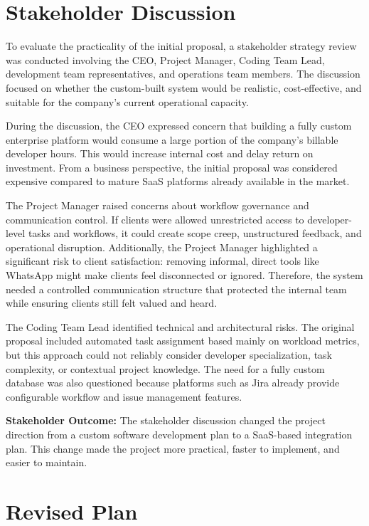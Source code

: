 \documentclass[12pt,a4paper]{report}
\begin{document}
\section{Stakeholder Discussion}

To evaluate the practicality of the initial proposal, a stakeholder strategy review was conducted involving the CEO, Project Manager, Coding Team Lead, development team representatives, and operations team members. The discussion focused on whether the custom-built system would be realistic, cost-effective, and suitable for the company’s current operational capacity.

During the discussion, the CEO expressed concern that building a fully custom enterprise platform would consume a large portion of the company’s billable developer hours. This would increase internal cost and delay return on investment. From a business perspective, the initial proposal was considered expensive compared to mature SaaS platforms already available in the market.

The Project Manager raised concerns about workflow governance and communication control. If clients were allowed unrestricted access to developer-level tasks and workflows, it could create scope creep, unstructured feedback, and operational disruption. Additionally, the Project Manager highlighted a significant risk to client satisfaction: removing informal, direct tools like WhatsApp might make clients feel disconnected or ignored. Therefore, the system needed a controlled communication structure that protected the internal team while ensuring clients still felt valued and heard.

The Coding Team Lead identified technical and architectural risks. The original proposal included automated task assignment based mainly on workload metrics, but this approach could not reliably consider developer specialization, task complexity, or contextual project knowledge. The need for a fully custom database was also questioned because platforms such as Jira already provide configurable workflow and issue management features.

\begin{noteBox}
\textbf{Stakeholder Outcome:} The stakeholder discussion changed the project direction from a custom software development plan to a SaaS-based integration plan. This change made the project more practical, faster to implement, and easier to maintain.
\end{noteBox}

\section{Revised Plan}
\end{document}
